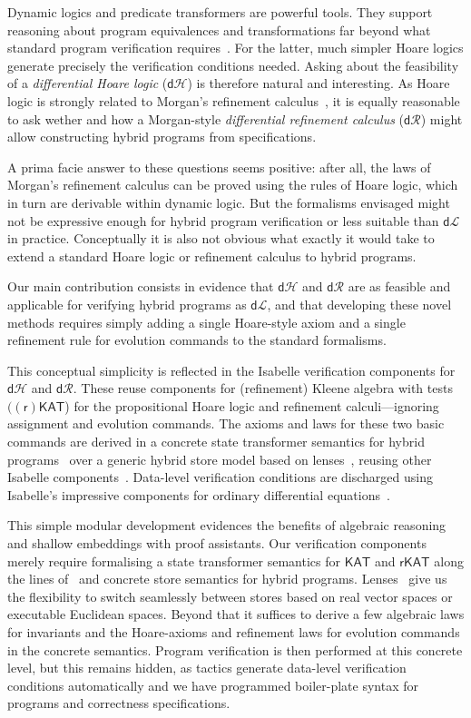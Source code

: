 \documentclass[envcountsame,envcountsect]{llncs}
\newcommand{\KAT}{\mathsf{KAT}}
\newcommand{\rKAT}{\mathsf{rKAT}}
\newcommand{\dL}{\mathsf{d}\mathcal{L}}
\newcommand{\dH}{\mathsf{d}\mathcal{H}}
\newcommand{\dR}{\mathsf{d}\mathcal{R}}
\begin{document}
Dynamic logics and predicate transformers are powerful tools. They
support reasoning about program equivalences and transformations
far beyond what standard program verification requires~\cite{BackW98}. For
the latter, much simpler Hoare logics generate precisely the
verification conditions needed.  Asking about the feasibility of a
\emph{differential Hoare logic} ($\dH$) is therefore natural and
interesting.  As Hoare logic is strongly related to Morgan's
refinement calculus~\cite{Morgan94}, it is equally reasonable to
ask wether and how a Morgan-style \emph{differential refinement calculus}
($\dR$) might allow constructing hybrid programs from specifications.

A prima facie answer to these questions seems positive: after all, the
laws of Morgan's refinement calculus can be proved using the rules of
Hoare logic, which in turn are derivable within dynamic logic. But the
formalisms envisaged might not be expressive enough for hybrid program
verification or less suitable than $\dL$ in practice. Conceptually it
is also not obvious what exactly it would take to extend a standard
Hoare logic or refinement calculus to hybrid programs.

Our main contribution consists in evidence that $\dH$ and $\dR$ are as
feasible and applicable for verifying hybrid programs as $\dL$, and
that developing these novel methods requires simply adding a single
Hoare-style axiom and a single refinement rule for evolution commands
to the standard formalisms.

This conceptual simplicity is reflected in the Isabelle verification
components for $\dH$ and $\dR$. These reuse components for
(refinement) Kleene algebra with
tests~\cite{Kozen97,ArmstrongGS16,afp:vericomp} $(\mathsf{(r)KAT}$)
for the propositional Hoare logic and refinement calculi---ignoring
assignment and evolution commands. The axioms and laws for these two
basic commands are derived in a concrete state transformer semantics
for hybrid programs~\cite{MuniveS19} over a generic hybrid store model
based on lenses~\cite{FosterZW16}, reusing other Isabelle
components~\cite{afp:hybrid,Foster18c-Optics,Foster19a-IsabelleUTP}.
Data-level verification conditions are discharged using Isabelle's
impressive components for ordinary differential
equations~\cite{ImmlerH12a}.

This simple modular development evidences the benefits of algebraic
reasoning and shallow embeddings with proof assistants. Our
verification components merely require formalising a state transformer
semantics for $\KAT$ and $\rKAT$ along the lines of~\cite{afp:hybrid}
and concrete store semantics for hybrid
programs. Lenses~\cite{FosterZW16} give us the flexibility to switch
seamlessly between stores based on real vector spaces or executable
Euclidean spaces. Beyond that it suffices to derive a few algebraic
laws for invariants and the Hoare-axioms and refinement laws for
evolution commands in the concrete semantics. Program verification is
then performed at this concrete level, but this remains hidden, as
tactics generate data-level verification conditions automatically and
we have programmed boiler-plate syntax for programs and correctness
specifications.
\end{document}
